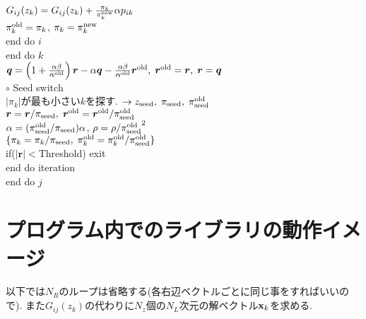 \documentclass[12pt,titlepage]{jarticle}
\begin{document}
$G_{i j}(z_k) = G_{i j}(z_k) + \frac{\pi_k}{\pi_k^{\rm new}} \alpha p_{i k}$
\\\hspace{2.0cm}
$\pi_k^{\rm old} = \pi_k$, $\pi_k = \pi_k^{\rm new}$
\\\hspace{1.5cm}
end do $i$
\\\hspace{1.0cm}
end do $k$
\\\hspace{1.0cm}
${\boldsymbol q} = \left( 1 + \frac{\alpha \beta}{\alpha^{\rm old}} \right) {\boldsymbol r}
- \alpha {\boldsymbol q} - \frac{\alpha \beta}{\alpha^{\rm old}} {\boldsymbol r}^{\rm old},\; 
{\boldsymbol r}^{\rm old} = {\boldsymbol r},\; {\boldsymbol r} = {\boldsymbol q}$
\\\hspace{1.0cm}
$\circ$ Seed switch
\\\hspace{1.0cm}
$|\pi_k|$が最も小さい$k$を探す. 
$\rightarrow z_{\rm seed},\; \pi_{\rm seed},\; \pi_{\rm seed}^{\rm old} $
\\\hspace{1.0cm}
${\boldsymbol r} = {\boldsymbol r} / \pi_{\rm seed},\; 
{\boldsymbol r}^{\rm old} = {\boldsymbol r}^{\rm old} / \pi_{\rm seed}^{\rm old}$
\\\hspace{1.0cm}
$\alpha = (\pi_{\rm seed}^{\rm old} / \pi_{\rm seed}) \alpha$,
$\rho = \rho / {\pi_{\rm seed}^{\rm old}}^2$
\\\hspace{1.0cm}
$\{\pi_k = \pi_k/\pi_{\rm seed},\; \pi_k^{\rm old} = \pi_k^{\rm old}/\pi_{\rm seed}^{\rm old}\}$
\\\hspace{1.0cm}
if($|{\boldsymbol r}| < $Threshold) exit
\\\hspace{0.5cm}
end do iteration
\\
end do $j$

\section{プログラム内でのライブラリの動作イメージ}

以下では$N_R$のループは省略する(各右辺ベクトルごとに同じ事をすればいいので).
また$G_{i j}(z_k)$の代わりに$N_z$個の$N_L$次元の解ベクトル${\bf x}_{k}$を求める.
\end{document}
